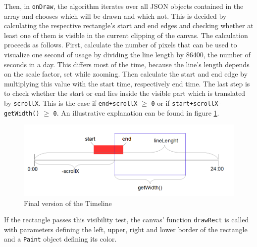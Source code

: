 Then,  in \lstinline$onDraw$, the algorithm iterates over all JSON objects contained in the array and chooses which will be drawn and which not. This is decided by calculating the respective rectangle's start and end edges and checking whether at least one of them is visible in the current clipping of the canvas. The calculation proceeds as follows. First, calculate the number of pixels that can be used to visualize one second of usage by dividing the line length by 86400, the number of seconds in a day. This differs most of the time, because the line's length depends on the scale factor, set while zooming. Then calculate the start and end edge by multiplying this value with the start time, respectively end time. The last step is to check whether the start or end lies inside the visible part which is translated by \lstinline{scrollX}. This is the case if \lstinline$end+scrollX$ $\ge$ \lstinline$0$ or if \lstinline$start+scrollX-getWidth()$ $\ge$ \lstinline$0$. An illustrative explanation can be found in figure \ref{fig:visibilitytest}.
\begin{figure}[h]
	\caption{Final version of the Timeline}
	\label{fig:visibilitytest}
	\includegraphics[width=\textwidth]{images/visibilitytest.png}
\end{figure}
If the rectangle passes this visibility test, the canvas' function \lstinline$drawRect$ is called with parameters defining the left, upper, right and lower border of the rectangle and a \lstinline$Paint$ object defining its color.

